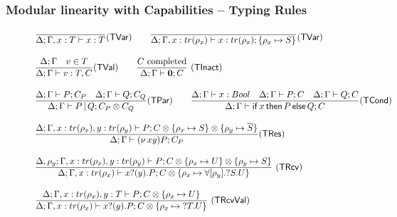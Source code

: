 \begin{frame}\frametitle{Modular linearity with Capabilities -- Typing Rules}
  \begin{figure}
  \tiny{
    \[
    \arraycolsep=0pt
    \begin{array}{ll}
    \tree{
    }{
      \Delta; \Gamma , x: T \types x: T
    }{}{\TVar}

    \qquad
    \tree{
    }{
      \Delta; \Gamma , x: tr(\rho_x) \types x: tr(\rho_x); \{\rho_x \mapsto S\}
    }{}{\TVar}
    \\ \\
    \tree{
    \Delta; \Gamma
    \andalso
      v \in T
    }{
      \Delta; \Gamma \types v: T, C
    }{}{\TVal}

    \qquad


    \tree{
    C \text{ completed}
    }{
    \Delta; \Gamma \types \nil; C
    }{\TInact}

    \\ \\

    \tree{
    \Delta; \Gamma \types P; C_P
    \andalso
    \Delta; \Gamma \types Q; C_Q
    }{
      \Delta; \Gamma \types P \pll Q; C_P \otimes C_Q
    }{}{\TPar}

    \qquad

    \tree{
      \Delta; \Gamma \types x: Bool \andalso \Delta; \Gamma \types P; C \andalso \Delta; \Gamma \types Q; C
    }{
      \Delta; \Gamma \types \cond{x}{P}{Q}; C
    }{}{\TCond}
    \\ \\
     \tree{
       \Delta; \Gamma, x: tr(\rho_x), y: tr(\rho_y) \types P; C \otimes \{\rho_x \mapsto S\} \otimes \{\rho_y \mapsto \tdual S\}
     }{
       \Delta; \Gamma \types \newn{xy} P; C_P
     }{}{\TRes}

     \\ \\



      \tree{
      \Delta, \rho_y; \Gamma, x : tr(\rho_x), y: tr(\rho_y) \types P; C \otimes \{\rho_x \mapsto U\} \otimes \{\rho_y \mapsto S\}
        }{
          \Delta; \Gamma, x: tr(\rho_x) \types \pin{x}{y} P; C \otimes \{\rho_x \mapsto \forall [\rho_y].\tin S U \}
        }{\TRcv}

        \\ \\
        \tree{
        \Delta; \Gamma, x : tr(\rho_x), y: T \types P; C \otimes \{\rho_x \mapsto U\}
          }{
            \Delta; \Gamma, x: tr(\rho_x) \types \pin{x}{y} P; C \otimes \{\rho_x \mapsto \tin T U \}
          }{\TRcvVal}


\end{array}\]}
\end{figure}
\end{frame}
